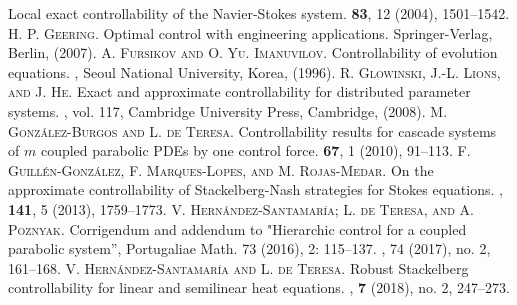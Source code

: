 \documentclass[preprint,10pt]{article}
\numberwithin{equation}{section}
\numberwithin{theorem}{section}
\begin{document}
{\begin{thebibliography}{7}
\newblock Local exact controllability of the Navier-Stokes system. 
 \textbf{83}, 12 (2004),  1501--1542.
%
%
\textsc{H. P. Geering.}
\newblock Optimal control with engineering applications.
\newblock Springer-Verlag, Berlin, (2007). 
%
\textsc{A. Fursikov and O. Yu. Imanuvilov.}
\newblock Controllability of evolution equations.
, Seoul National University, Korea, (1996).
%
%
\textsc{R. Glowinski, J.-L. Lions, and J. He.}
\newblock Exact and approximate controllability for distributed parameter systems.
, vol. 117, Cambridge University Press, Cambridge, (2008).
%
\textsc{M. Gonz\'alez-Burgos and L. de Teresa.}
\newblock Controllability results for cascade systems of $m$ coupled parabolic PDEs by one control force.
 \textbf{67}, 1 (2010), 91--113.
%
\textsc{F. Guill\'en-Gonz\'alez, F. Marques-Lopes, and M. Rojas-Medar.}
\newblock On the approximate controllability of {S}tackelberg-{N}ash strategies
  for {S}tokes equations.
, \textbf{141}, 5 (2013),
  1759--1773.
\textsc{V. Hern\'andez-Santamar\'ia; L. de Teresa, and A. Poznyak}.
\newblock Corrigendum and addendum to "Hierarchic control for a coupled parabolic system'', Portugaliae Math. 73 (2016), 2: 115--137. 
, 74 (2017), no. 2, 161--168.
\textsc{V. Hern\'andez-Santamar\'ia and L. de Teresa.}
\newblock Robust Stackelberg controllability for linear and semilinear heat equations. 
, \textbf{7} (2018), no. 2, 247--273.


\end{thebibliography}}
\end{document}
